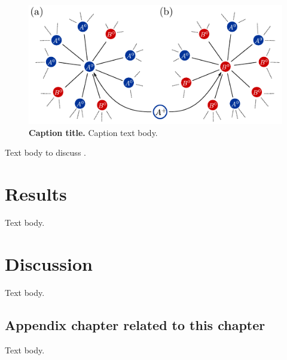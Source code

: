\begin{figure}
	\centering
	\includegraphics[scale = 1]{technology_draft}
	\caption{\textbf{Caption title.}
		Caption text body.
	}
	\label{fig:technology_draft}
\end{figure}
Text body to discuss .


\section{Results}\label{sec:results}
Text body.

\section{Discussion} \label{sec:discussion}
Text body.

\begin{subappendices}
\section{Appendix chapter related to this chapter} \label{app:chapter_01}
Text body.
\end{subappendices}
